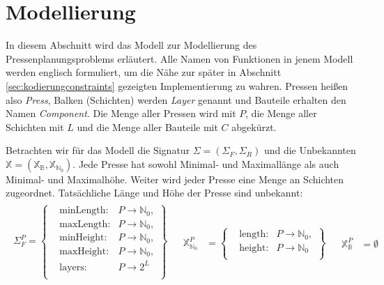 \section{Modellierung}
\label{sec:modellierung}
In diesem Abschnitt wird das Modell zur Modellierung des Pressenplanungsproblems erläutert.
Alle Namen von Funktionen in jenem Modell werden englisch formuliert, um die Nähe zur später in Abschnitt \ref{sec:kodierungconstraints} gezeigten Implementierung zu wahren.
Pressen heißen also \textit{Press}, Balken (Schichten) werden \textit{Layer} genannt und Bauteile erhalten den Namen \textit{Component}.
Die Menge aller Pressen wird mit $P$, die Menge aller Schichten mit $L$ und die Menge aller Bauteile mit $C$ abgekürzt.

Betrachten wir für das Modell die Signatur $\Sigma = \left( \Sigma_F, \Sigma_R \right)$ und die Unbekannten $\mathbb{X} = (\mathbb{X}_{\mathbb{B}}, \mathbb{X}_{\mathbb{N}_0})$.
Jede Presse hat sowohl Minimal- und Maximallänge als auch Minimal- und Maximalhöhe.
Weiter wird jeder Presse eine Menge an Schichten zugeordnet.
Tatsächliche Länge und Höhe der Presse sind unbekannt:
\[
    \begin{array}{lll}
        \begin{aligned}
            \Sigma_{F}^{P} = \left\{
            \begin{aligned}
                & \text{minLength}: & P \rightarrow \mathbb{N}_0, \\
                & \text{maxLength}: & P \rightarrow \mathbb{N}_0, \\
                & \text{minHeight}: & P \rightarrow \mathbb{N}_0, \\
                & \text{maxHeight}: & P \rightarrow \mathbb{N}_0, \\
                & \text{layers}: & P \rightarrow 2^{L} \; \\
            \end{aligned} \right\} \\[5pt]
        \end{aligned}
        &
        \begin{aligned}
            \mathbb{X}_{\mathbb{N}_0}^{P} &= \left\{
                \begin{aligned}
                    & \text{length}: & P \rightarrow \mathbb{N}_0, \\
                    & \text{height}: & P \rightarrow \mathbb{N}_0 \; \\
                \end{aligned} \right\}
        \end{aligned}
        &
        \begin{aligned}
            \mathbb{X}_{\mathbb{B}}^{P} &= \emptyset
        \end{aligned}
    \end{array}
\]
